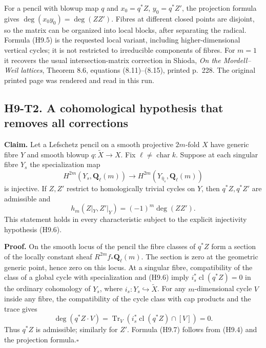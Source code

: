 For a pencil with blowup map $q$ and $x_0=q^*Z$, $y_0=q^*Z'$, the
projection formula gives $\deg(x_0y_0)=\deg(ZZ')$. Fibres at different
closed points are disjoint, so the matrix can be organized into local
blocks, after separating the radical. Formula (H9.5) is the requested
local variant, including higher-dimensional vertical cycles; it is not
restricted to irreducible components of fibres. For $m=1$ it recovers the
usual intersection-matrix correction in Shioda, \emph{On the Mordell--Weil
lattices}, Theorem 8.6, equations (8.11)--(8.15), printed p.~228. The
original printed page was rendered and read in this run.

\subsection*{H9-T2. A cohomological hypothesis that removes all corrections}

\textbf{Claim.} Let a Lefschetz pencil on a smooth projective $2m$-fold
$X$ have generic fibre $Y$ and smooth blowup $q:\widetilde X\to X$.
Fix $\ell\ne\operatorname{char}k$. Suppose at each singular fibre $Y_s$
the specialization map
\[
 H^{2m}(Y_s,\mathbf Q_\ell(m))\longrightarrow
 H^{2m}(Y_{\bar\eta_s},\mathbf Q_\ell(m))       \tag{H9.6}
\]
is injective. If $Z,Z'$ restrict to homologically trivial cycles on $Y$,
then $q^*Z,q^*Z'$ are admissible and
\[
 h_m(Z|_Y,Z'|_Y)=(-1)^m\deg(ZZ').               \tag{H9.7}
\]
This statement holds in every characteristic subject to the explicit
injectivity hypothesis (H9.6).

\textbf{Proof.} On the smooth locus of the pencil the fibre classes of
$q^*Z$ form a section of the locally constant sheaf
$R^{2m}f_*\mathbf Q_\ell(m)$. The section is zero at the geometric generic
point, hence zero on this locus. At a singular fibre, compatibility of the
class of a global cycle with specialization and (H9.6) imply
$i_s^*\operatorname{cl}(q^*Z)=0$ in the ordinary cohomology of $Y_s$,
where $i_s:Y_s\hookrightarrow\widetilde X$. For any $m$-dimensional cycle $V$
inside any fibre, the compatibility of the cycle class with cap products
and the trace gives
\[
 \deg(q^*Z\cdot V)=
 \operatorname{Tr}_{V}(i_s^*\operatorname{cl}(q^*Z)\cap[V])=0.
\]
Thus $q^*Z$ is admissible; similarly for $Z'$. Formula (H9.7) follows
from (H9.4) and the projection formula.\hfill$\square$

